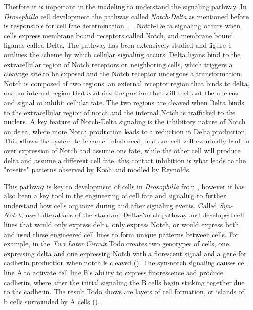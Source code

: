 \documentclass[12pt]{ifacconf}
\begin{document}
Therfore it is important in the modeling to understand the signaling pathway. In \emph{Drosophilla} cell development the pathway called \emph{Notch-Delta} as mentioned before is responsible for cell fate determination. \cite{LN:04},  \cite{ATN:95} . Notch-Delta signaling occurs when cells express membrane bound receptors called Notch, and membrane bound ligands called Delta. The pathway has been extensively studied and figure 1 outlines the scheme by which cellular signaling occurs. Delta ligans bind to the extracellular region of Notch receptors on neighboring cells, which triggers a cleavage site to be exposed and the Notch receptor undergoes a transformation. Notch is composed of two regions, an external receptor region that binds to delta, and an internal region that contains the portion that will seek out the nucleus and signal or inhibit cellular fate. The two regions are cleaved when Delta binds to the extracellular region of notch and the internal Notch is trafficked to the nucleus. A key feature of Notch-Delta signaling is the inhibitory nature of Notch on delta, where more Notch production leads to a reduction in Delta production. This allows the system to become unbalanced, and one cell will eventually lead to over expression of Notch and assume one fate, while the other cell will produce delta and assume a different cell fate. this contact inhibition is what leads to the "rosette" patterns observed by Kooh and modled by Reynolds. 

This pathway is key to development of cells in \emph{Drosophilla} from \cite{KI:93}, however it has also been a key tool in the engineering of cell fate and signaling to further understand how cells organize during and after signaling events. Called \emph{Syn-Notch}, \cite{TP:18} used alterations of the standard Delta-Notch pathway and developed cell lines that would only express delta, only express Notch, or would express both and used these engineered cell lines to form unique patterns between cells. For example, in the \emph{ Two Later Circuit} Todo creates two genotypes of cells, one expressing delta and one expressing Notch with a florescent signal and a gene for cadherin production when notch is cleaved (\cite{TP:18}). The syn-notch signaling causes cell line A to activate cell line B's ability to express fluorescence and produce cadherin, where after the initial signaling the B cells begin sticking together due to the cadherin.  The result Todo shows are layers of cell formation, or islands of b cells surrounded by A cells (\cite{TP:18}). 
\end{document}

